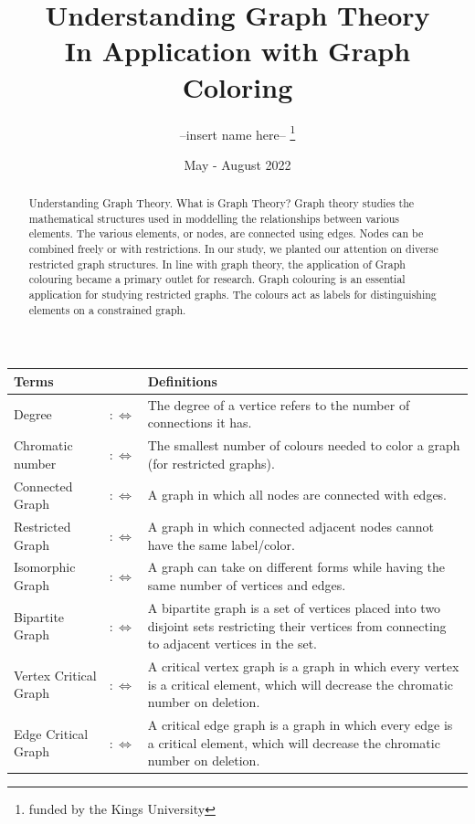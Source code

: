 \documentclass[12pt, letterpaper, twoside]{article}
\title{%
  Understanding Graph Theory \\
  
  \large In Application with Graph Coloring}
\author{ --insert name here-- \thanks{funded by the Kings University}}
\date{ May - August 2022 }
\begin{document}
\begin{titlepage}
\maketitle
\end{titlepage}

\begin{abstract}
Understanding Graph Theory. What is Graph Theory? 
Graph theory studies the mathematical structures used in moddelling the relationships between various elements.
The various elements, or nodes, are connected using edges. 
Nodes can be combined freely or with restrictions. In our study, we planted our attention on diverse restricted graph structures.
In line with graph theory, the application of Graph colouring became a primary outlet for research. Graph colouring is an essential application for studying restricted graphs. 
The colours act as labels for distinguishing elements on a constrained graph.
\end{abstract}

\begin{tabular}{l c p{}}
\toprule
Terms           &                  & Definitions \\
\midrule
Degree &$:\Leftrightarrow$& The degree of a vertice refers to the number of connections it has.\\
Chromatic number &$:\Leftrightarrow$& The smallest number of colours needed to color a graph (for restricted graphs).\\
Connected Graph  &$:\Leftrightarrow$& A graph in which all nodes are connected with edges. \\
Restricted Graph  &$:\Leftrightarrow$& A graph in which connected adjacent nodes cannot have the same label/color.\\
Isomorphic Graph  &$:\Leftrightarrow$& A graph can take on different forms while having the same number of vertices and edges.\\
Bipartite Graph  &$:\Leftrightarrow$& A bipartite graph is a set of vertices placed into two disjoint sets restricting their vertices from connecting to adjacent vertices in the set.\\
Vertex Critical Graph  &$:\Leftrightarrow$& A critical vertex graph is a graph in which every vertex is a critical element, which will decrease the chromatic number on deletion.\\
Edge Critical Graph  &$:\Leftrightarrow$& A critical edge graph is a graph in which every edge is a critical element, which will decrease the chromatic number on deletion.\\

\bottomrule
\end{tabular}
\end{document}
